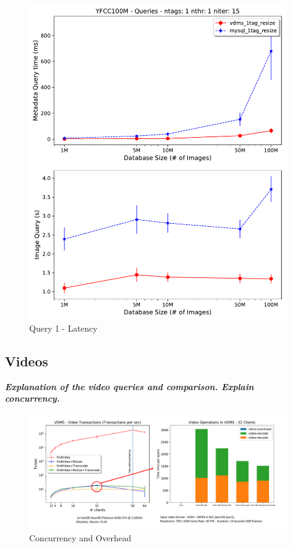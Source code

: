 \begin{figure}[]
\centering
\includegraphics[width=\columnwidth]{figures/q1_latency}
\caption{Query 1 - Latency}
\label{fig:q1_latency}
\end{figure}



\subsection{Videos}

\textbf{\textit{Explanation of the video queries and comparison.
Explain concurrency.}}

\begin{figure}[]
\centering
\includegraphics[width=\textwidth]{figures/video_overhead}
\caption{Concurrency and Overhead}
\label{fig:video}
\end{figure}

